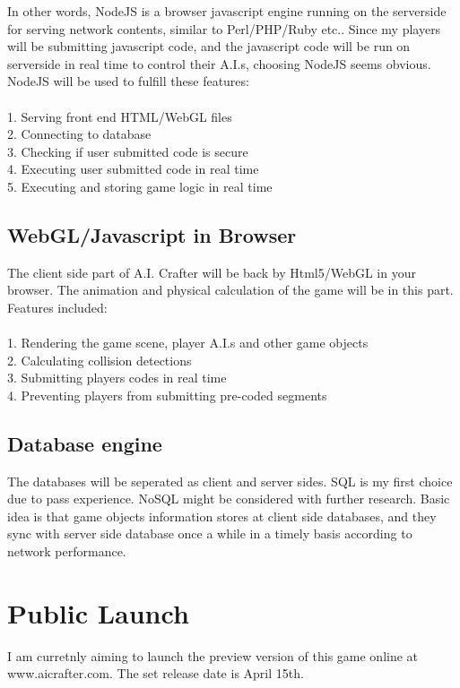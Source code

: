 \documentclass[12pt]{article}
\begin{document}
In other words, NodeJS is a browser javascript engine running on the serverside for serving network contents, similar to Perl/PHP/Ruby etc.. Since my players will be submitting javascript code, and the javascript code will be run on serverside in real time to control their A.I.s, choosing NodeJS seems obvious. NodeJS will be used to fulfill these features:\\
\\
1. Serving front end HTML/WebGL files\\
2. Connecting to database\\
3. Checking if user submitted code is secure\\
4. Executing user submitted code in real time\\
5. Executing and storing game logic in real time\\

\subsection{WebGL/Javascript in Browser}
The client side part of A.I. Crafter will be back by Html5/WebGL in your browser.
The animation and physical calculation of the game will be in this part. Features included:\\
\\
1. Rendering the game scene, player A.I.s and other game objects\\
2. Calculating collision detections\\
3. Submitting players codes in real time\\
4. Preventing players from submitting pre-coded segments\\

\subsection{Database engine}
The databases will be seperated as client and server sides. SQL is my first choice due to pass experience. NoSQL might be considered with further research. Basic idea is that game objects information stores at client side databases, and they sync with server side database once a while in a timely basis according to network performance.

\section{Public Launch}
I am curretnly aiming to launch the preview version of this game online at www.aicrafter.com. The set release date is April 15th. 
\end{document}
